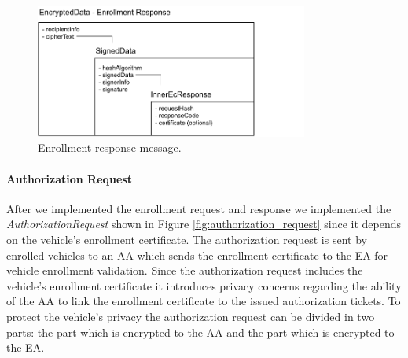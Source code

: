 \begin{figure}
	\centering
	\includegraphics[width=0.8\textwidth]{Figures/enrollmentresponse}
	\caption{\label{fig:enrollment_response}Enrollment response message.}
\end{figure}

\paragraph{Authorization Request}
After we implemented the enrollment request and response we implemented the \textit{AuthorizationRequest} shown in Figure \ref{fig:authorization_request} since it depends on the vehicle's enrollment certificate. The authorization request is sent by enrolled vehicles to an AA which sends the enrollment certificate to the EA for vehicle enrollment validation. Since the authorization request includes the vehicle's enrollment certificate it introduces privacy concerns regarding the ability of the AA to link the enrollment certificate to the issued authorization tickets. To protect the vehicle's privacy the authorization request can be divided in two parts: the part which is encrypted to the AA and the part which is encrypted to the EA.

